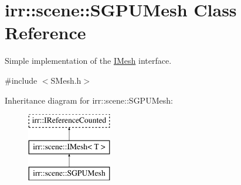 \hypertarget{classirr_1_1scene_1_1SGPUMesh}{}\section{irr\+:\+:scene\+:\+:S\+G\+P\+U\+Mesh Class Reference}
\label{classirr_1_1scene_1_1SGPUMesh}


Simple implementation of the \hyperlink{classirr_1_1scene_1_1IMesh}{I\+Mesh} interface.  




{\ttfamily \#include $<$S\+Mesh.\+h$>$}

Inheritance diagram for irr\+:\+:scene\+:\+:S\+G\+P\+U\+Mesh\+:\begin{figure}[H]
\begin{center}
\leavevmode
\includegraphics[height=3.000000cm]{classirr_1_1scene_1_1SGPUMesh}
\end{center}
\end{figure}
